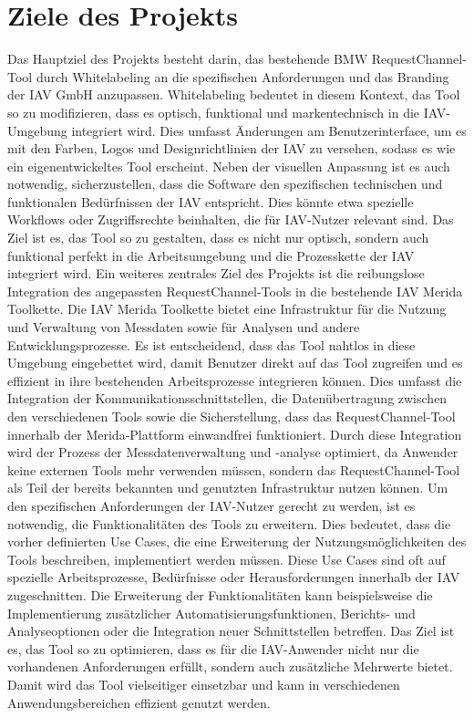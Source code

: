 \section{Ziele des Projekts}
Das Hauptziel des Projekts besteht darin, das bestehende BMW RequestChannel-Tool durch Whitelabeling an die spezifischen Anforderungen und das Branding der IAV GmbH anzupassen. Whitelabeling bedeutet in diesem Kontext, das Tool so zu modifizieren, dass es optisch, funktional und markentechnisch in die IAV-Umgebung integriert wird. Dies umfasst Änderungen am Benutzerinterface, um es mit den Farben, Logos und Designrichtlinien der IAV zu versehen, sodass es wie ein eigenentwickeltes Tool erscheint. Neben der visuellen Anpassung ist es auch notwendig, sicherzustellen, dass die Software den spezifischen technischen und funktionalen Bedürfnissen der IAV entspricht. Dies könnte etwa spezielle Workflows oder Zugriffsrechte beinhalten, die für IAV-Nutzer relevant sind. Das Ziel ist es, das Tool so zu gestalten, dass es nicht nur optisch, sondern auch funktional perfekt in die Arbeitsumgebung und die Prozesskette der IAV integriert wird.
\newline
\newline
Ein weiteres zentrales Ziel des Projekts ist die reibungslose Integration des angepassten RequestChannel-Tools in die bestehende IAV Merida Toolkette. Die IAV Merida Toolkette bietet eine Infrastruktur für die Nutzung und Verwaltung von Messdaten sowie für Analysen und andere Entwicklungsprozesse. Es ist entscheidend, dass das Tool nahtlos in diese Umgebung eingebettet wird, damit Benutzer direkt auf das Tool zugreifen und es effizient in ihre bestehenden Arbeitsprozesse integrieren können. Dies umfasst die Integration der Kommunikationsschnittstellen, die Datenübertragung zwischen den verschiedenen Tools sowie die Sicherstellung, dass das RequestChannel-Tool innerhalb der Merida-Plattform einwandfrei funktioniert. Durch diese Integration wird der Prozess der Messdatenverwaltung und -analyse optimiert, da Anwender keine externen Tools mehr verwenden müssen, sondern das RequestChannel-Tool als Teil der bereits bekannten und genutzten Infrastruktur nutzen können.
\newline
\newline
Um den spezifischen Anforderungen der IAV-Nutzer gerecht zu werden, ist es notwendig, die Funktionalitäten des Tools zu erweitern. Dies bedeutet, dass die vorher definierten Use Cases, die eine Erweiterung der Nutzungsmöglichkeiten des Tools beschreiben, implementiert werden müssen. Diese Use Cases sind oft auf spezielle Arbeitsprozesse, Bedürfnisse oder Herausforderungen innerhalb der IAV zugeschnitten. Die Erweiterung der Funktionalitäten kann beispielsweise die Implementierung zusätzlicher Automatisierungsfunktionen, Berichts- und Analyseoptionen oder die Integration neuer Schnittstellen betreffen. Das Ziel ist es, das Tool so zu optimieren, dass es für die IAV-Anwender nicht nur die vorhandenen Anforderungen erfüllt, sondern auch zusätzliche Mehrwerte bietet. Damit wird das Tool vielseitiger einsetzbar und kann in verschiedenen Anwendungsbereichen effizient genutzt werden.
